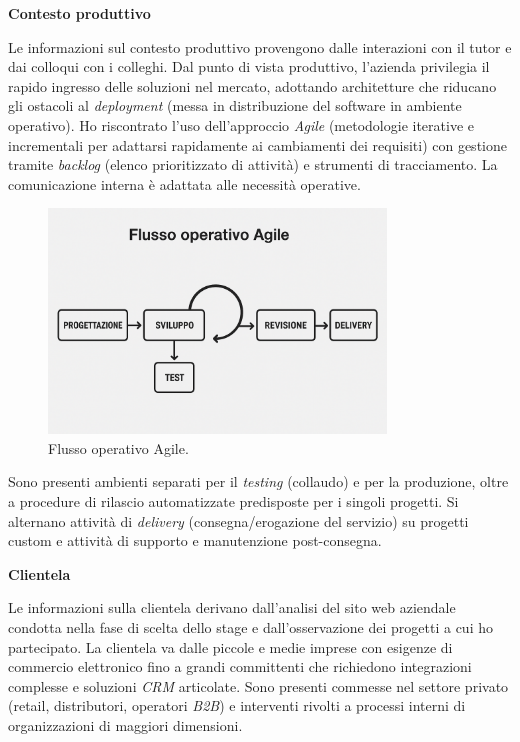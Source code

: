 \medskip
\noindent\textbf{Contesto produttivo}

Le informazioni sul contesto produttivo provengono dalle interazioni con il tutor e dai colloqui con i colleghi. 
Dal punto di vista produttivo, l'azienda privilegia il rapido ingresso delle soluzioni nel mercato, adottando architetture che riducano gli ostacoli al 
\emph{deployment} (messa in distribuzione del software in ambiente operativo). Ho riscontrato l'uso dell'approccio \emph{Agile} (metodologie iterative e incrementali per adattarsi rapidamente ai cambiamenti dei requisiti) 
con gestione tramite \emph{backlog} (elenco prioritizzato di attività) e strumenti di tracciamento. La comunicazione interna è adattata alle necessità operative.

\begin{figure}[htbp]
    \centering
    \includegraphics[width=0.8\textwidth]{images/azienda/metodo_agile.png}
    \caption{Flusso operativo Agile.}
    \label{fig:agile}
\end{figure}

Sono presenti ambienti separati per il \emph{testing} (collaudo) e per la produzione, oltre a procedure di rilascio automatizzate predisposte per i singoli progetti. 
Si alternano attività di \emph{delivery} (consegna/erogazione del servizio) su progetti custom e attività di supporto e manutenzione post-consegna.

\medskip
\noindent\textbf{Clientela}

Le informazioni sulla clientela derivano dall'analisi del sito web aziendale condotta nella fase di scelta dello stage e dall'osservazione dei progetti a cui ho partecipato. 
La clientela va dalle piccole e medie imprese con esigenze di commercio elettronico fino a grandi committenti che richiedono integrazioni complesse e soluzioni \emph{CRM} articolate. 
Sono presenti commesse nel settore privato (retail, distributori, operatori \emph{B2B}) e interventi rivolti a processi interni di organizzazioni di maggiori dimensioni.


